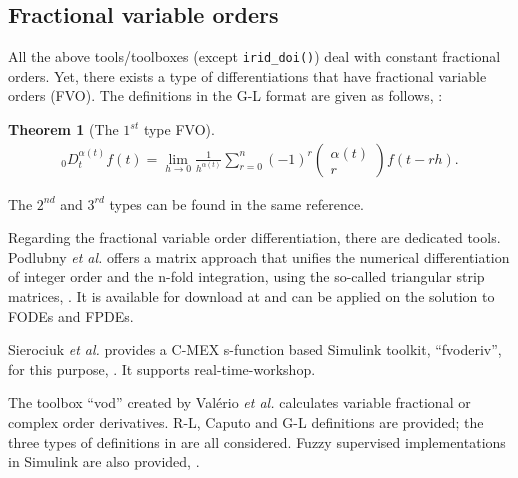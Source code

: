 \documentclass[11pt]{tCON2e}
\theoremstyle{plain}\newtheorem{theorem}{Theorem}
\theoremstyle{definition}
\theoremstyle{remark}
\begin{document}
\subsection{Fractional variable orders}
All the above tools/toolboxes (except {\tt irid\_doi()}) deal with constant fractional orders. Yet, there exists a type of differentiations that have fractional variable orders (FVO). The definitions in the G-L format are given as follows, \cite{ref:FVO_Lorenzo}:
\begin{theorem}[The $1^{st}$ type FVO]
\begin{eqnarray}
{_0}D_t^{\alpha(t)}f(t) = \lim_{h\rightarrow 0} \frac{1}{h^{\alpha (t)}} \sum _{r=0}^{n} (-1)^r \left(\!\!\! {\begin{array}{*{20}{c}}
        { \alpha (t) }\\
        r
        \end{array}}\!\!\! \right)
        f(t - rh).
\end{eqnarray}
\end{theorem}
\noindent
The $2^{nd}$ and $3^{rd}$ types can be found in the same reference.

Regarding the fractional variable order differentiation, there are dedicated tools.
Podlubny \emph{et al.} offers a matrix approach that unifies the numerical differentiation of integer order and the n-fold integration, using the so-called triangular strip matrices,
\cite{ref:Igor_matrix_approach}. It is available for download at \cite{ref:Igor_matrix_approach_download} and can be applied on the solution to FODEs and FPDEs.

Sierociuk \emph{et al.} provides a C-MEX s-function based Simulink toolkit, ``fvoderiv'', for this purpose, \cite{ref:fvoderiv_Dominik}. It supports real-time-workshop.

The toolbox ``vod'' created by Val\'{e}rio \emph{et al.} calculates variable fractional or complex order derivatives. R-L, Caputo and G-L definitions are provided; the three types of definitions in \cite{ref:FVO_Lorenzo} are all considered. Fuzzy supervised implementations in Simulink are also provided, \cite{ref:FVO_Valerio}.
\end{document}
